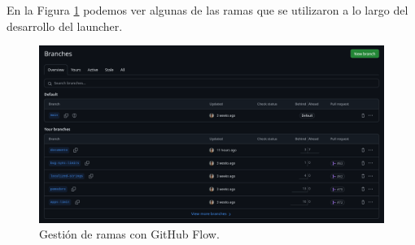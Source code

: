 En la Figura \ref{fig:ramas_de_github} podemos ver algunas de las ramas que se utilizaron a lo largo del desarrollo del launcher.
\begin{figure}[ht]
  \caption{Gestión de ramas con GitHub Flow.}
  \label{fig:ramas_de_github}
  \includegraphics[width=\textwidth]{Figuras/ramas_de_github.png}
  \centering
\end{figure}